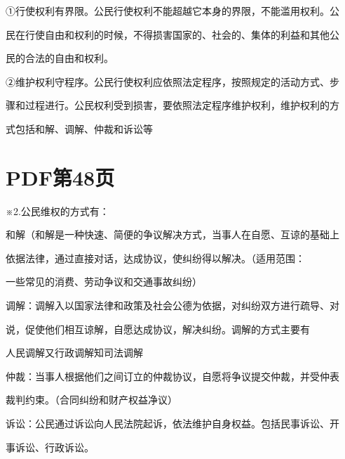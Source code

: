 \documentclass[lang=cn,11pt]{elegantbook}
\newcommand{\daofasym}[1]{{\daofasymbolfont #1}}
\newcommand{\daofasym}[1]{#1}
\begin{document}
\daofasym{①}行使权利有界限。公民行使权利不能超越它本身的界限，不能滥用权利。公\par

民在行使自由和权利的时候，不得损害国家的、社会的、集体的利益和其他公\par

民的合法的自由和权利。\par

\daofasym{②}维护权利守程序。公民行使权利应依照法定程序，按照规定的活动方式、步\par

骤和过程进行。公民权利受到损害，要依照法定程序维护权利，维护权利的方\par

式包括和解、调解、仲裁和诉讼等\par


\section*{PDF第48页}

※2.公民维权的方式有：\par

和解（和解是一种快速、简便的争议解决方式，当事人在自愿、互谅的基础上\par

依据法律，通过直接对话，达成协议，使纠纷得以解决。（适用范围：\par

一些常见的消费、劳动争议和交通事故纠纷）\par

调解：调解入以国家法律和政策及社会公德为依据，对纠纷双方进行疏导、对\par

说，促使他们相互谅解，自愿达成协议，解决纠纷。调解的方式主要有\par

人民调解又行政调解知司法调解\par

仲裁：当事人根据他们之间订立的仲裁协议，自愿将争议提交仲裁，并受仲表\par

裁判约束。（合同纠纷和财产权益净议）\par

诉讼：公民通过诉讼向人民法院起诉，依法维护自身权益。包括民事诉讼、开\par

事诉讼、行政诉讼。\par
\end{document}
